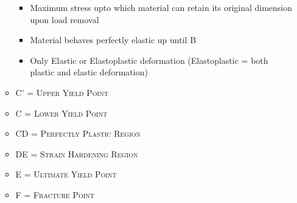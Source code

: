 \documentclass[8pt]{article}
\begin{document}
\begin{itemize}
\begin{itemize}
\begin{itemize}
						\item Maximum stress upto which material can retain its original dimension upon load removal
						\item Material behaves perfectly elastic up until B
						\item Only Elastic or Elastoplastic deformation (Elastoplastic = both plastic and elastic deformation)
					\end{itemize}
				\item \textsc{C' = Upper Yield Point}
				\item \textsc{C = Lower Yield Point}
				\item \textsc{CD = Perfectly Plastic Region}
				\item \textsc{DE = Strain Hardening Region}
				\item \textsc{E = Ultimate Yield Point}
				\item \textsc{F = Fracture Point}
			\end{itemize}
	\end{itemize}
\end{document}
